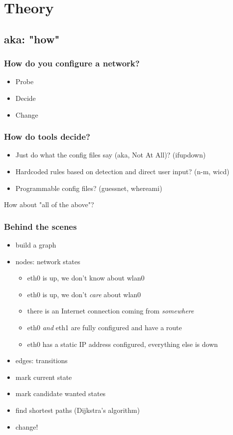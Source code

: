 \documentclass[ignorenonframetext]{beamer}
\begin{document}
\section{Theory}
\subsection{aka: "how"}
\begin{frame}
  \frametitle{How do you configure a network?}
  \begin{itemize}
    \item Probe
    \item Decide
    \item Change
  \end{itemize}
\end{frame}

\begin{frame}
  \frametitle{How do tools decide?}
  \begin{itemize}
    \item Just do what the config files say (aka, Not At All)? (ifupdown)
    \item Hardcoded rules based on detection and direct user input? (n-m, wicd)
    \item Programmable config files? (guessnet, whereami)
  \end{itemize}
  How about "all of the above"?
\end{frame}

\begin{frame}
  \frametitle{Behind the scenes}
  \begin{itemize}
    \item build a graph
    \item nodes: network states
    \begin{itemize}
      \item eth0 is up, we don't know about wlan0
      \item eth0 is up, we don't \emph{care} about wlan0
      \item there is an Internet connection coming from \emph{somewhere}
      \item eth0 \emph{and} eth1 are fully configured and have a route
      \item eth0 has a static IP address configured, everything else is down
    \end{itemize}
    \item edges: transitions
    \item mark current state
    \item mark candidate wanted states
    \item find shortest paths (Dijkstra's algorithm)
    \item change!
  \end{itemize}
\end{frame}
\end{document}
